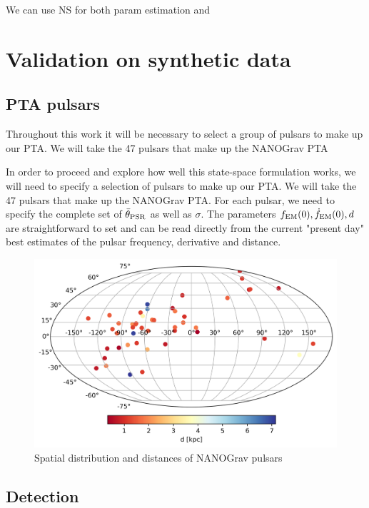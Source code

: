 \documentclass[fleqn,usenatbib,useAMS]{mnras}
\begin{document}
We can use NS for both param estimation and 



\section{Validation on synthetic data}








\subsection{PTA pulsars}
Throughout this work it will be necessary to select a group of pulsars to make up our PTA. We will take the 47 pulsars that make up the NANOGrav PTA \citep{2020ApJ...905L..34A}





In order to proceed and explore how well this state-space formulation works, we will need to specify a selection of pulsars to make up our PTA. We will take the 47 pulsars that make up the NANOGrav PTA. For each pulsar, we need to specify the complete set of $\bar{\theta}_{\rm PSR}$ as well as $\sigma$. The parameters $f_{\rm EM}(0), \dot{f}_{\rm EM}(0),d$ are straightforward to set and can be read directly from  the current "present day" best estimates of the pulsar frequency, derivative and distance. 


\begin{figure}
	\includegraphics[width=0.8\columnwidth]{images/pulsars}
	\caption{Spatial distribution and distances of NANOGrav pulsars}
	\label{fig:pulsar_distrib}
\end{figure}


\subsection{Detection}
\end{document}
